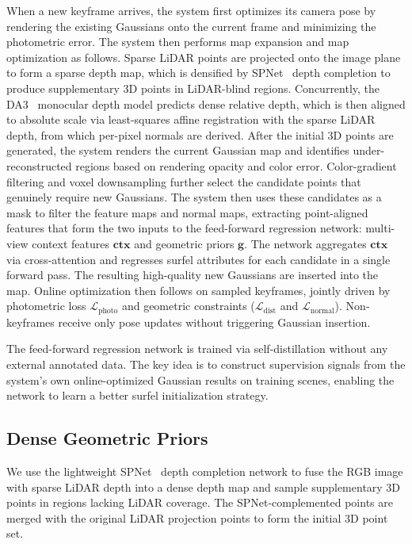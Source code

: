 \documentclass[letterpaper,journal]{IEEEtran}
\begin{document}
When a new keyframe arrives, the system first optimizes its camera pose by rendering the existing Gaussians onto the current frame and minimizing the photometric error. The system then performs map expansion and map optimization as follows. Sparse LiDAR points are projected onto the image plane to form a sparse depth map, which is densified by SPNet~\cite{li2023spnet} depth completion to produce supplementary 3D points in LiDAR-blind regions. Concurrently, the DA3~\cite{lin2025da3} monocular depth model predicts dense relative depth, which is then aligned to absolute scale via least-squares affine registration with the sparse LiDAR depth, from which per-pixel normals are derived. After the initial 3D points are generated, the system renders the current Gaussian map and identifies under-reconstructed regions based on rendering opacity and color error. Color-gradient filtering and voxel downsampling further select the candidate points that genuinely require new Gaussians. The system then uses these candidates as a mask to filter the feature maps and normal maps, extracting point-aligned features that form the two inputs to the feed-forward regression network: multi-view context features $\mathbf{ctx}$ and geometric priors $\mathbf{g}$. The network aggregates $\mathbf{ctx}$ via cross-attention and regresses surfel attributes for each candidate in a single forward pass. The resulting high-quality new Gaussians are inserted into the map. Online optimization then follows on sampled keyframes, jointly driven by photometric loss $\mathcal{L}_{\text{photo}}$ and geometric constraints ($\mathcal{L}_{\text{dist}}$ and $\mathcal{L}_{\text{normal}}$). Non-keyframes receive only pose updates without triggering Gaussian insertion.

The feed-forward regression network is trained via self-distillation without any external annotated data. The key idea is to construct supervision signals from the system's own online-optimized Gaussian results on training scenes, enabling the network to learn a better surfel initialization strategy.

\subsection{Dense Geometric Priors}

We use the lightweight SPNet~\cite{li2023spnet} depth completion network to fuse the RGB image with sparse LiDAR depth into a dense depth map and sample supplementary 3D points in regions lacking LiDAR coverage. The SPNet-complemented points are merged with the original LiDAR projection points to form the initial 3D point set.
\end{document}
